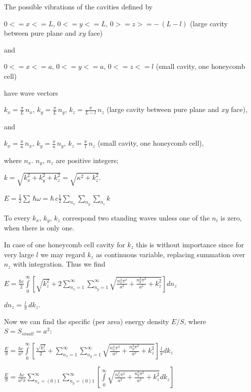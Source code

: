\documentclass[twoside, 10pt]{article}
\begin{document}
\begin{multicols}{2}
    The possible vibrations of the cavities defined by

\(0<=x<=L\), \(0<=y<=L\), \(0>=z>=-\,(L-l)\) (large cavity between pure
plane and \(xy\) face)

and

\(0<=x<=a\), \(0<=y<=a\), \(0<=z<=l\) (small cavity, one honeycomb cell)

    have wave vectors

\(k_x = \frac{\pi}{L}\,n_x\), \(k_y = \frac{\pi}{L}\,n_y\),
\(k_z = \frac{\pi}{L-l}\,n_z\) (large cavity between pure plane and
\(xy\) face),

and

\(k_x = \frac{\pi}{a}\,n_x\), \(k_y = \frac{\pi}{a}\,n_y\),
\(k_z = \frac{\pi}{l}\,n_z\) (small cavity, one honeycomb cell),

where \(n_x\). \(n_y\), \(n_z\) are positive integers;

\(k = \sqrt{k_x^2+k_y^2+k_z^2} = \sqrt{\kappa^2+k_z^2}\).

\(E = \frac{1}{2}\sum\,\hbar\omega = \hbar\,c\frac{1}{2}\sum\limits_{n_x}^{}\sum\limits_{n_y}^{}\sum\limits_{n_z}^{}k\)

    To every \(k_x\), \(k_y\), \(k_z\) correspond two standing waves unless
one of the \(n_i\) is zero, when there is only one.

In case of one honeycomb cell cavity for \(k_z\) this is without
importance since for very large \(l\) we may regard \(k_z\) as
continuous variable, replacing summation over \(n_z\) with integration.
Thus we find

\noindent
\(E = \frac{\hbar c}{2}\int\limits_{0}^{\infty}\left[{\sqrt{k_z^2}+2\sum\limits_{n_x=1}^{\infty}\sum\limits_{n_y=1}^{\infty}\sqrt{\frac{n_x^2\pi^2}{a^2}+\frac{n_y^2\pi^2}{a^2}+k_z^2}}\right]d{n_z}\)

\(dn_z = \frac{l}{\pi}\,dk_z\).

    Now we can find the specific (per area) energy density \(E/S\), where
\(S = S_{small} = a^2\):

\noindent
    \(\frac{E}{S} = \frac{\hbar c}{a^2}\int\limits_{0}^{\infty}\left[{\frac{\sqrt{k_z^2}}{2}+\sum\limits_{n_x=1}^{\infty}\sum\limits_{n_y=1}^{\infty}\sqrt{\frac{n_x^2\pi^2}{a^2}+\frac{n_y^2\pi^2}{a^2}+k_z^2}}\right]\frac{l}{\pi}dk_z\)

    \(\frac{E}{S} = \frac{\hbar c}{a^2 \pi}\sum\limits_{n_x=(0)1}^{\infty}\sum\limits_{n_y=(0)1}^{\infty}\left[\int\limits_{0}^{\infty}\sqrt{\frac{n_x^2\pi^2}{a^2}+\frac{n_y^2\pi^2}{a^2}+k_z^2} dk_z\right]\)


\end{multicols}
\end{document}
